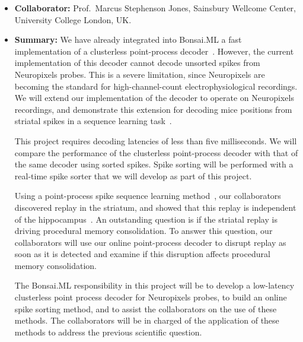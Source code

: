 
\begin{itemize}

    \item\textbf{Collaborator:} Prof.~Marcus Stephenson Jones, Sainsbury
        Wellcome Center, University College London, UK.

    \item\textbf{Summary:} We have already integrated into Bonsai.ML a fast
        implementation of a clusterless point-process decoder~\citep[i.e., a
        decoder that does not require spike sorting and is suitable for
        real-time usage;][]{denovellisEtAl21}. However, the current
        implementation of this decoder cannot decode unsorted spikes from
        Neuropixels probes.
        This is a severe limitation, since Neuropixels are becoming the
        standard for high-channel-count electrophysiological recordings.
        We will extend our implementation of the decoder to operate on
        Neuropixels recordings, and demonstrate this extension for decoding
        mice positions from striatal spikes in a sequence learning
        task~\citep{thompsonEtAl24}.

        This project requires decoding latencies of less than five
        milliseconds. We will compare the performance of the clusterless
        point-process decoder with that of the same decoder using sorted
        spikes.
        Spike sorting will be performed with a real-time spike sorter that we
        will develop as part of this project.

        Using a point-process spike sequence learning
        method~\citep{williamsEtAl20}, our collaborators discovered replay in
        the striatum, and showed that this replay is independent of the
        hippocampus~\citep{thompsonEtAl24}. An outstanding question is if the
        striatal replay is driving procedural memory consolidation. To answer
        this question, our collaborators will use our online point-process
        decoder to disrupt replay as soon as it is detected and examine if this
        disruption affects procedural memory consolidation.

        The Bonsai.ML responsibility in this project will be to develop a
        low-latency clusterless point process decoder for Neuropixels probes,
        to build an online spike sorting method, and to assist the
        collaborators on the use of these methods. The collaborators will be
        in charged of the application of these methods to address the previous
        scientific question.


\end{itemize}
